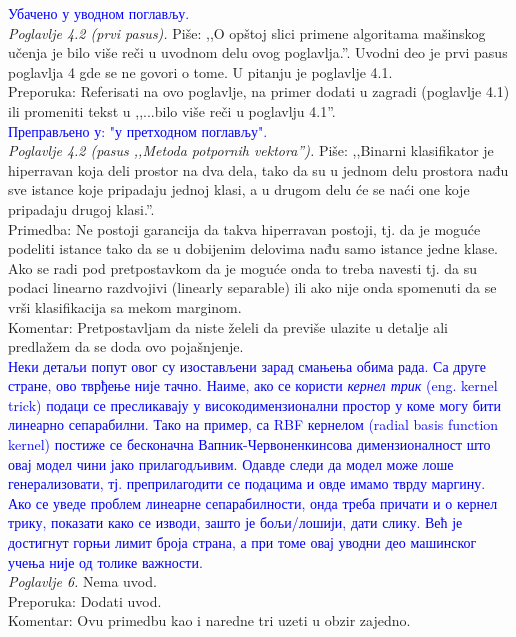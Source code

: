 \documentclass[a4paper]{report}
\newcommand{\odgovor}[1]{\textcolor{blue}{#1}}
\begin{document}
\odgovor{Убачено у уводном поглављу.}\\


\textit{Poglavlje 4.2 (prvi pasus).} Piše: ,,O opštoj slici primene algoritama mašinskog učenja je bilo više reči u uvodnom delu ovog poglavlja.''. Uvodni deo je prvi pasus poglavlja 4 gde se ne govori o tome. U pitanju je poglavlje 4.1. \\
\indent Preporuka: Referisati na ovo poglavlje, na primer dodati u zagradi (poglavlje 4.1) ili promeniti tekst u ,,...bilo više reči u poglavlju 4.1''. \\


\odgovor{Преправљено у: "у претходном поглављу".}\\


\textit{Poglavlje 4.2 (pasus ,,Metoda potpornih vektora'').} Piše: ,,Binarni klasifikator je hiperravan koja deli prostor na dva dela, tako da su u jednom delu prostora nađu sve istance koje pripadaju jednoj klasi, a u drugom delu će se naći one koje pripadaju drugoj klasi.''. \\
\indent Primedba: Ne postoji garancija da takva hiperravan postoji, tj. da je moguće podeliti istance tako da se u dobijenim delovima nađu samo istance jedne klase. Ako se radi pod pretpostavkom da je moguće onda to treba navesti tj. da su podaci linearno razdvojivi (linearly separable) ili ako nije onda spomenuti da se vrši klasifikacija sa mekom marginom. \\
\indent Komentar: Pretpostavljam da niste želeli da previše ulazite u detalje ali predlažem da se doda ovo pojašnjenje. \\


\odgovor{Неки детаљи попут овог су изостављени зарад смањења обима рада. Са друге стране, ово тврђење није тачно. Наиме, ако се користи \textit{кернел трик} (eng. kernel trick) подаци се пресликавају у високодимензионални простор у коме могу бити линеарно сепарабилни. Тако на пример, са RBF кернелом (radial basis function kernel) постиже се бесконачна Вапник-Червоненкинсова димензионалност што овај модел чини јако прилагодљивим. Одавде следи да модел може лоше генерализовати, тј. преприлагодити се подацима и овде имамо тврду маргину. Ако се уведе проблем линеарне сепарабилности, онда треба причати и о кернел трику, показати како се изводи, зашто је бољи/лошији, дати слику. Већ је достигнут горњи лимит броја страна, а при томе овај уводни део машинског учења није од толике важности.}\\


\textit{Poglavlje 6.} Nema uvod. \\
\indent Preporuka: Dodati uvod. \\
\indent Komentar: Ovu primedbu kao i naredne tri uzeti u obzir zajedno. \\
\end{document}
